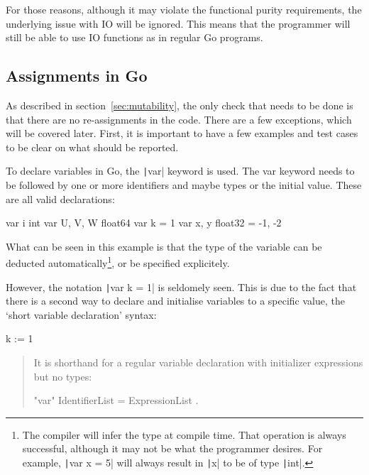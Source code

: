 For those reasons, although it may violate the functional purity requirements,
the underlying issue with IO will be ignored. This means that the programmer
will still be able to use IO functions as in regular Go programs.

\subsection{Assignments in Go}

As described in section~\ref{sec:mutability}, the only check that needs
to be done is that there are no re-assignments in the code. There are a few
exceptions, which will be covered later. First, it is important to have
a few examples and test cases to be clear on what should be reported.

To declare variables in Go, the \texttt|var| keyword is used.
The var keyword needs to be followed by one or more identifiers and maybe
types or the initial value. These are all valid declarations:

\begin{code}
	\begin{gocode}
var i int
var U, V, W float64
var k = 1
var x, y float32 = -1, -2
	\end{gocode}
\end{code}
What can be seen in this example is that the type of the variable can be
deducted automatically\footnote{The compiler will infer the type at compile
time. That operation is always successful, although it may not be what
the programmer desires. For example, \texttt|var x = 5| will
always result in \texttt|x| to be of type \texttt|int|.},
or be specified explicitely.

However, the notation \texttt|var k = 1| is seldomely seen. This
is due to the fact that there is a second way to declare and initialise
variables to a specific value, the `short variable declaration' syntax:

\begin{gocode}
	k := 1
\end{gocode}
\begin{quote}
It is shorthand for a regular variable declaration with initializer expressions but no types:

\begin{bnfcode}
"var" IdentifierList = ExpressionList .
\end{bnfcode}
\end{quote}\autocite{short-hand-decl}

